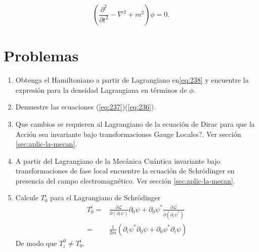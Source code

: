 \begin{equation}
\label{eq:152}
  \left(
\frac{\partial^2}{\partial t^2}-\nabla^2+m^2
  \right)\phi=0.
\end{equation}

\section{Problemas}
\label{sec:problemas-2}
\renewcommand{\labelenumi}{\thechapter.\theenumi} %
\begin{enumerate}
\item Obtenga el Hamiltoniano a partir de Lagrangiano en\eqref{eq:238} y encuentre la expresi\'on para la densidad Lagrangiana en t\'erminos de $\phi$.
\label{item:pch1.0} %
\item Demuestre las ecuaciones (\ref{eq:237})(\ref{eq:236}).
\label{item:pch1.1} %

\item \textquestiondown Que cambios se requieren al Lagrangiano de la ecuaci\'on de Dirac para que la Acci\'on sea invariante bajo transformaciones Gauge Locales?. Ver secci\'on \ref{sec:aplic-la-mecan}.



\label{item:pch1.3} %

\item A partir del Lagrangiano de la Mec\'anica Cu\'antica invariante bajo transformaciones de fase local encuentre la ecuaci\'on de Schr\"odinger en presencia del campo electromagn\'etico. Ver secci\'on \ref{sec:aplic-la-mecan}.
 



\item Calcule $T^i_0$ para el Lagrangiano de Schr\"odinger
  \begin{align}
    T^i_0=&\frac{\partial\mathcal{L}}{\partial(\partial_i \psi)}\partial_0\psi+\partial_0\psi^*\frac{\partial\mathcal{L}}{\partial(\partial_i \psi^*)}\nonumber\\
    =&\frac{1}{2m}\left(\partial_i\psi^*\partial_0\psi+\partial_0\psi^*\partial_i\psi \right)
  \end{align}
De modo que $T^0_i\neq T^i_0$.

\end{enumerate}


\renewcommand{\labelenumi}{\theenumi} %
